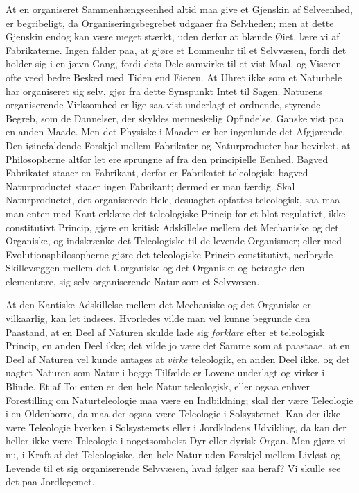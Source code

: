 \documentclass[12pt,a4paper]{book}
\begin{document}
At en organiseret Sammenhængseenhed altid maa give et Gjenskin af Selveenhed,
er begribeligt, da Organiseringsbegrebet udgaaer fra Selvheden; men at dette
Gjenskin endog kan være meget stærkt, uden derfor at blænde Øiet, lære vi af
Fabrikaterne. Ingen falder paa, at gjøre et Lommeuhr til et Selvvæsen, fordi
det holder sig i en jævn Gang, fordi dets Dele samvirke til et vist Maal, og
Viseren ofte veed bedre Besked med Tiden end Eieren. At Uhret ikke som et
Naturhele har organiseret sig selv, gjør fra dette Synspunkt Intet til Sagen.
Naturens organiserende Virksomhed er lige saa vist underlagt et ordnende,
styrende Begreb, som de Dannelser, der skyldes menneskelig Opfindelse. Ganske
vist paa en anden Maade. Men det Physiske i Maaden er her ingenlunde det
Afgjørende. Den iøinefaldende Forskjel mellem Fabrikater og Naturproducter har
bevirket, at Philosopherne altfor let ere sprungne af fra den principielle
Eenhed. Bagved Fabrikatet staaer en Fabrikant, derfor er Fabrikatet
teleologisk; bagved Naturproductet staaer ingen Fabrikant; dermed er man
færdig. Skal Naturproductet, det organiserede Hele, desuagtet opfattes
teleologisk, saa maa man enten med Kant erklære det teleologiske Princip for et
blot regulativt, ikke constitutivt Princip, gjøre en kritisk Adskillelse mellem
det Mechaniske og det Organiske, og indskrænke det Teleologiske til de levende
Organismer; eller med Evolutionsphilosopherne gjøre det teleologiske Princip
constitutivt, nedbryde Skillevæggen mellem det Uorganiske og det Organiske og
betragte den elementære, sig selv organiserende Natur som et Selvvæsen.

At den Kantiske Adskillelse mellem det Mechaniske og det Organiske er
vilkaarlig, kan let indsees. Hvorledes vilde man vel kunne begrunde den
Paastand, at en Deel
af Naturen skulde lade sig \emph{forklare} efter et teleologisk Princip, en
anden Deel ikke; det vilde jo være det Samme som at paastaae, at en Deel af
Naturen vel kunde antages at \emph{virke} teleologik, en anden Deel ikke, og
det uagtet Naturen som Natur i begge Tilfælde er Lovene underlagt og virker i
Blinde. Et af To: enten er den hele Natur teleologisk, eller ogsaa enhver
Forestilling om Naturteleologie maa være en Indbildning; skal der være
Teleologie i en Oldenborre, da maa der ogsaa være Teleologie i Solsystemet. Kan
der ikke være Teleologie hverken i Solsystemets eller i Jordklodens Udvikling,
da kan der heller ikke være Teleologie i nogetsomhelst Dyr eller dyrisk Organ.
Men gjøre vi nu, i Kraft af det Teleologiske, den hele Natur uden Forskjel
mellem Livløst og Levende til et sig organiserende Selvvæsen, hvad følger saa
heraf? Vi skulle see det paa Jordlegemet.
\end{document}
